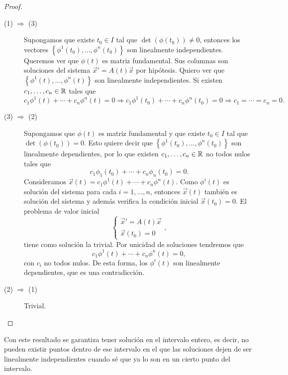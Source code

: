 \begin{proof}
\begin{description}
	\item[(1) $\displaystyle \Rightarrow $ (3)] Supongamos que existe $\displaystyle t_{0} \in I $ tal que $\displaystyle \det\left(\phi\left(t_{0}\right)\right)\neq 0 $, entonces los vectores $\displaystyle \left\{ \phi^{1}\left(t_{0}\right), \ldots , \phi^{n}\left(t_{0}\right)\right\}  $ son linealmente independientes. Queremos ver que $\displaystyle \phi\left(t\right) $ es matriz fundamental. Sus columnas son soluciones del sistema $\displaystyle \vec{x}' = A\left(t\right)\vec{x} $ por hipótesis. Quiero ver que $\displaystyle \left\{ \phi^{1}\left(t\right), \ldots, \phi^{n}\left(t\right)\right\}  $ son linealmente independientes. 
		Si existen $\displaystyle c_{1}, \ldots, c_{n} \in \mathbb{R} $ tales que 
		\[c_{1}\phi^{1}\left(t\right) + \cdots + c_{n}\phi^{n}\left(t\right)=0 \Rightarrow c_{1}\phi^{1}\left(t_{0}\right)+\cdots + c_{n}\phi^{n}\left(t_{0}\right)=0 \Rightarrow c_{1} = \cdots = c_{n}= 0 .\]	
\item[(3) $\displaystyle \Rightarrow $ (2)] Supongamos que $\displaystyle \phi\left(t\right) $ es matriz fundamental y que existe $\displaystyle t_{0} \in I $ tal que $\displaystyle \det\left(\phi\left(t_{0}\right)\right)=0 $. 
	Esto quiere decir que $\displaystyle \left\{ \phi^{1}\left(t_{0}\right), \ldots, \phi^{n}\left(t_{0}\right)\right\}  $ son linealmente dependientes, por lo que existen $\displaystyle c_{1}, \ldots, c_{n} \in \mathbb{R} $ no todos nulos tales que 
	\[c_{1}\phi_{1}\left(t_{0}\right)+\cdots + c_{n}\phi_{n}\left(t_{0}\right)=0 .\]
Consideramos $\displaystyle \vec{x}\left(t\right)=c_{1}\phi^{1}\left(t\right) + \cdots + c_{n}\phi^{n}\left(t\right) $. Como $\displaystyle \phi^{i}\left(t\right) $ es solución del sistema para cada $\displaystyle i = 1, \ldots, n $, entonces $\displaystyle \vec{x}\left(t\right) $ también es solución del sistema y además verifica la condición inicial $\displaystyle \vec{x}\left(t_{0}\right)=0 $. 
El problema de valor inicial
\[
\begin{cases}
\vec{x}' = A\left(t\right)\vec{x} \\
\vec{x}\left(t_{0}\right)=0
\end{cases}
,\]
tiene como solución la trivial. Por unicidad de soluciones tendremos que 
\[c_{1}\phi^{1}\left(t\right) + \cdots +c_{n}\phi^{n}\left(t\right)=0 ,\]
con $\displaystyle c_{i} $ no todos nulos. De esta forma, los $\displaystyle \phi^{i}\left(t\right) $ son linealmente dependientes, que es una contradicción. 
\item[(2) $\displaystyle \Rightarrow $ (1)] Trivial. 
\end{description}
\end{proof}
\begin{observation}
Con este resultado se garantiza tener solución en el intervalo entero, es decir, no pueden existir puntos dentro de ese intervalo en el que las soluciones dejen de ser linealmente independientes cuando sé que ya lo son en un cierto punto del intervalo.
\end{observation}

